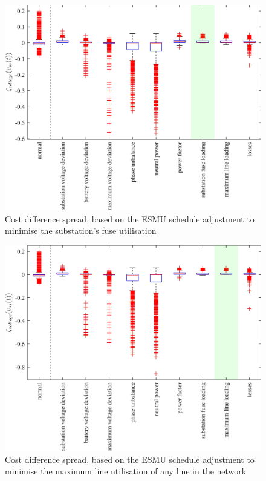 \begin{figure}\centering
	\includegraphics{_chapter1/fig/appendix/minimising-substation-fuse-loading}
	\caption{Cost difference spread, based on the ESMU schedule adjustment to minimise the substation's fuse utilisation}
\end{figure}

\begin{figure}\centering
	\includegraphics{_chapter1/fig/appendix/minimising-maximum-line-loading}
	\caption{Cost difference spread, based on the ESMU schedule adjustment to minimise the maximum line utilisation of any line in the network}
\end{figure}

